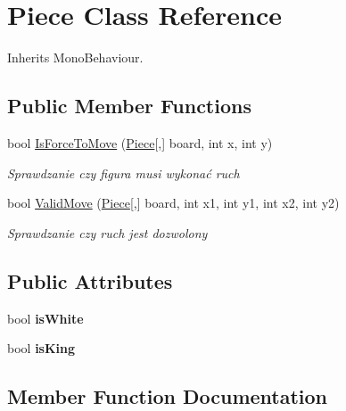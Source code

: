 \hypertarget{class_piece}{}\section{Piece Class Reference}
\label{class_piece}


Inherits Mono\+Behaviour.

\subsection*{Public Member Functions}
\begin{DoxyCompactItemize}
\item 
bool \mbox{\hyperlink{class_piece_a198cbea588f4837bc7ac94d479d4949d}{Is\+Force\+To\+Move}} (\mbox{\hyperlink{class_piece}{Piece}}\mbox{[},\mbox{]} board, int x, int y)
\begin{DoxyCompactList}\small\item\em Sprawdzanie czy figura musi wykonać ruch \end{DoxyCompactList}\item 
bool \mbox{\hyperlink{class_piece_a0ef5bca84cf0f16a7f2a1d3008a3449d}{Valid\+Move}} (\mbox{\hyperlink{class_piece}{Piece}}\mbox{[},\mbox{]} board, int x1, int y1, int x2, int y2)
\begin{DoxyCompactList}\small\item\em Sprawdzanie czy ruch jest dozwolony \end{DoxyCompactList}\end{DoxyCompactItemize}
\subsection*{Public Attributes}
\begin{DoxyCompactItemize}
\item 
\mbox{\label{class_piece_a28a67b12d31bdfe57d2001b2b228044e}} 
bool {\bfseries is\+White}
\item 
\mbox{\label{class_piece_a4d65b8c7f802234ce69449d9d37bb793}} 
bool {\bfseries is\+King}
\end{DoxyCompactItemize}


\subsection{Member Function Documentation}
\mbox{\label{class_piece_a198cbea588f4837bc7ac94d479d4949d}} 
